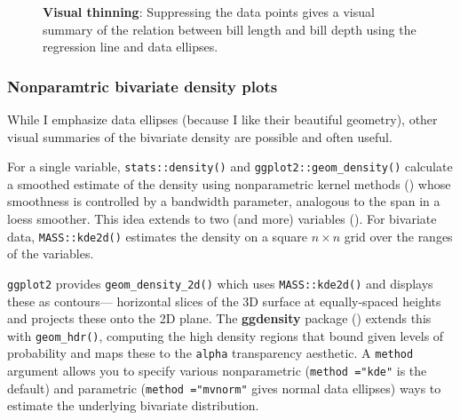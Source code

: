 \documentclass[
  letterpaper,
  10pt,
  krantz2]{krantz}
\begin{document}
{\begin{figure}[H]


\caption{\label{fig-peng-ggplot2}\textbf{Visual thinning}: Suppressing
the data points gives a visual summary of the relation between bill
length and bill depth using the regression line and data ellipses.}

\end{figure}%

\subsubsection{Nonparamtric bivariate density
plots}\label{nonparamtric-bivariate-density-plots}

While I emphasize data ellipses (because I like their beautiful
geometry), other visual summaries of the bivariate density are possible
and often useful.

For a single variable, \texttt{stats::density()} and
\texttt{ggplot2::geom\_density()} calculate a smoothed estimate of the
density using nonparametric kernel methods
() whose smoothness is
controlled by a bandwidth parameter, analogous to the span in a loess
smoother. This idea extends to two (and more) variables
(). For bivariate data,
\texttt{MASS::kde2d()} estimates the density on a square \(n \times n\)
grid over the ranges of the variables.

\texttt{ggplot2} provides \texttt{geom\_density\_2d()} which uses
\texttt{MASS::kde2d()} and displays these as contours--- horizontal
slices of the 3D surface at equally-spaced heights and projects these
onto the 2D plane. The \textbf{ggdensity} package
() extends this with
\texttt{geom\_hdr()}, computing the high density regions that bound
given levels of probability and maps these to the \texttt{alpha}
transparency aesthetic. A \texttt{method} argument allows you to specify
various nonparametric (\texttt{method\ ="kde"} is the default) and
parametric (\texttt{method\ ="mvnorm"} gives normal data ellipses) ways
to estimate the underlying bivariate distribution.

}
\end{document}
